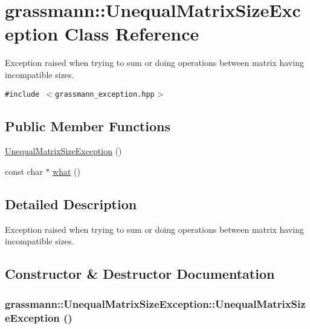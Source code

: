 \hypertarget{classgrassmann_1_1UnequalMatrixSizeException}{
\section{grassmann::UnequalMatrixSizeException Class Reference}
\label{classgrassmann_1_1UnequalMatrixSizeException}
}
Exception raised when trying to sum or doing operations between matrix having incompatible sizes.  


{\tt \#include $<$grassmann\_\-exception.hpp$>$}

\subsection*{Public Member Functions}
\begin{CompactItemize}
\item 
\hyperlink{classgrassmann_1_1UnequalMatrixSizeException_b0a801de9d1550a35c409bfecc919159}{UnequalMatrixSizeException} ()
\item 
const char $\ast$ \hyperlink{classgrassmann_1_1UnequalMatrixSizeException_2dd3f968d0dfeecc47c8e527ad99825e}{what} ()
\end{CompactItemize}


\subsection{Detailed Description}
Exception raised when trying to sum or doing operations between matrix having incompatible sizes. 

\subsection{Constructor \& Destructor Documentation}
\hypertarget{classgrassmann_1_1UnequalMatrixSizeException_b0a801de9d1550a35c409bfecc919159}{
\subsubsection[UnequalMatrixSizeException]{\setlength{\rightskip}{0pt plus 5cm}grassmann::UnequalMatrixSizeException::UnequalMatrixSizeException ()}}
\label{classgrassmann_1_1UnequalMatrixSizeException_b0a801de9d1550a35c409bfecc919159}




